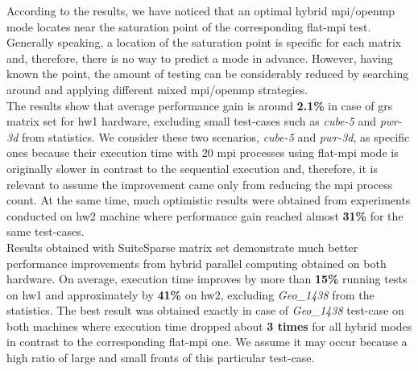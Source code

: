 

According to the results, we have noticed that an optimal hybrid \gls{mpi}/\gls{openmp} mode locates near the saturation point of the corresponding flat-\gls{mpi} test. Generally speaking, a location of the saturation point is specific for each matrix and, therefore, there is no way to predict a mode in advance. However, having known the point, the amount of testing can be considerably reduced by searching around and applying different mixed \gls{mpi}/\gls{openmp} strategies.\\


The results show that average performance gain is around \textbf{2.1\%} in case of \gls{grs} matrix set for \gls{hw1} hardware, excluding small test-cases such as \textit{cube-5} and \textit{pwr-3d} from statistics. We consider these two scenarios, \textit{cube-5} and \textit{pwr-3d}, as specific ones because their execution time with 20 \gls{mpi} processes using flat-\gls{mpi} mode is originally slower in contrast to the sequential execution and, therefore, it is relevant to assume the improvement came only from reducing the \gls{mpi} process count. At the same time, much optimistic results were obtained from experiments conducted on \gls{hw2} machine where performance gain reached almost \textbf{31\%} for the same test-cases.\\



Results obtained with SuiteSparse matrix set demonstrate much better performance improvements from hybrid parallel computing obtained on both hardware. On average, execution time improves by more than \textbf{15\%} running tests on \gls{hw1} and approximately by \textbf{41\%} on \gls{hw2}, excluding \textit{Geo\_1438} from the statistics. The best result was obtained exactly in case of \textit{Geo\_1438} test-case on both machines where execution time dropped about \textbf{3 times} for all hybrid modes in contrast to the corresponding flat-\gls{mpi} one. We assume it may occur because a high ratio of large and small fronts of this particular test-case.\\


